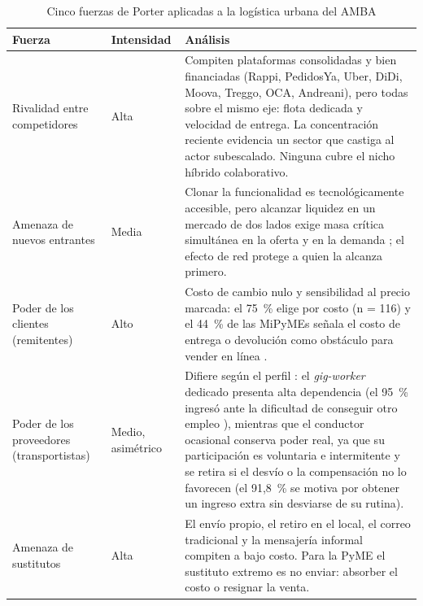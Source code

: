 {\begin{table}[H]
    \caption{Cinco fuerzas de Porter aplicadas a la logística urbana del AMBA}
    \label{tab:porter}
    \centering\color{nuevo}
    \small
    \begin{tabular}{p{3.1cm}p{1.9cm}p{8.6cm}}
        \toprule
        \textbf{Fuerza} & \textbf{Intensidad} & \textbf{Análisis} \\
        \midrule
        Rivalidad entre competidores & Alta & Compiten plataformas consolidadas y bien financiadas (Rappi, PedidosYa, Uber, DiDi, Moova, Treggo, OCA, Andreani), pero todas sobre el mismo eje: flota dedicada y velocidad de entrega. La concentración reciente evidencia un sector que castiga al actor subescalado. Ninguna cubre el nicho híbrido colaborativo. \\
        Amenaza de nuevos entrantes & Media & Clonar la funcionalidad es tecnológicamente accesible, pero alcanzar liquidez en un mercado de dos lados exige masa crítica simultánea en la oferta y en la demanda \parencite{AkamatsuOyama2023}; el efecto de red protege a quien la alcanza primero. \\
        Poder de los clientes (remitentes) & Alto & Costo de cambio nulo y sensibilidad al precio marcada: el 75~\% elige por costo (n = 116) y el 44~\% de las MiPyMEs señala el costo de entrega o devolución como obstáculo para vender en línea \parencite{ICC2024}. \\
        Poder de los proveedores (transportistas) & Medio, asimétrico & Difiere según el perfil \parencite{LuyEtAl2023}: el \emph{gig-worker} dedicado presenta alta dependencia (el 95~\% ingresó ante la dificultad de conseguir otro empleo \parencite{OIT2020}), mientras que el conductor ocasional conserva poder real, ya que su participación es voluntaria e intermitente y se retira si el desvío o la compensación no lo favorecen (el 91,8~\% se motiva por obtener un ingreso extra sin desviarse de su rutina). \\
        Amenaza de sustitutos & Alta & El envío propio, el retiro en el local, el correo tradicional y la mensajería informal compiten a bajo costo. Para la PyME el sustituto extremo es no enviar: absorber el costo o resignar la venta. \\
        \bottomrule
    \end{tabular}
\end{table}

}
